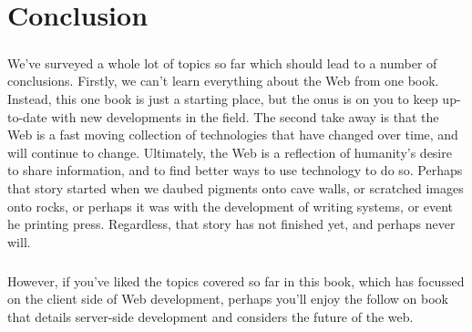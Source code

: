 \chapter{Conclusion}
\label{conclusion}
\paragraph{} We've surveyed a whole lot of topics so far which should lead to a number of conclusions. Firstly, we can't learn everything about the Web from one book. Instead, this one book is just a starting place, but the onus is on you to keep up-to-date with new developments in the field. The second take away is that the Web is a fast moving collection of technologies that have changed over time, and will continue to change. Ultimately, the Web is a reflection of humanity's desire to share information, and to find better ways to use technology to do so. Perhaps that story started when we daubed pigments onto cave walls, or scratched images onto rocks, or perhaps it was with the development of writing systems, or event he printing press. Regardless, that story has not finished yet, and perhaps never will.
\paragraph{} However, if you've liked the topics covered so far in this book, which has focussed on the client side of Web development, perhaps you'll enjoy the follow on book that details server-side development and considers the future of the web.
